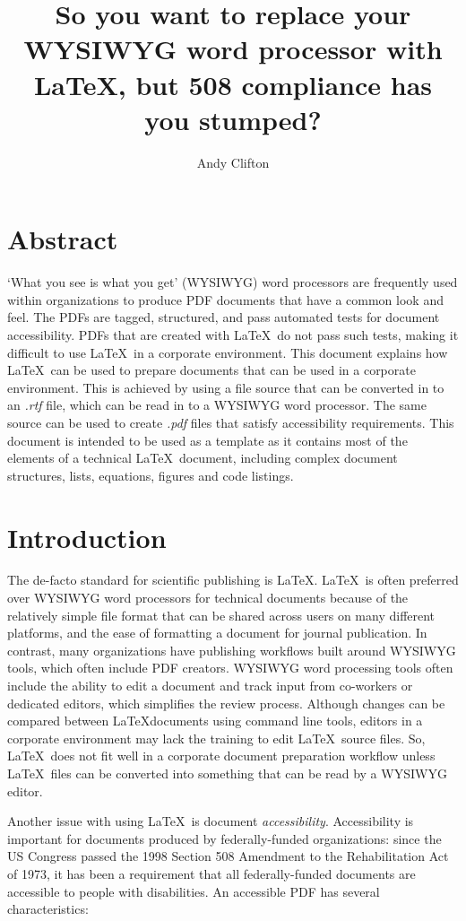 \documentclass[12pt,letterpaper]{article}
\author{Andy Clifton}
\title{So you want to replace your WYSIWYG word processor with LaTeX, but 508 compliance has you stumped?}
\newcommand{\fn}[1]{\emph{#1}}
\begin{document}
\section*{Abstract}
`What you see is what you get' (WYSIWYG) word processors are frequently used within organizations to produce PDF documents that have a common look and feel. The PDFs are tagged, structured, and pass automated tests for document accessibility. PDFs that are created with \LaTeX\ do not pass such tests, making it difficult to use \LaTeX\ in a corporate environment. This document explains how \LaTeX\ can be used to prepare documents that can be used in a corporate environment. This is achieved by using a file source that can be converted in to an \fn{.rtf} file, which can be read in to a WYSIWYG word processor. The same source can be used to create \fn{.pdf} files that satisfy accessibility requirements. This document is intended to be used as a template as it contains most of the elements of a technical \LaTeX\ document, including complex document structures, lists, equations, figures and code listings.

\clearpage
{}
\tableofcontents
\listoffigures
\listoftables

\section{Introduction}
The de-facto standard for scientific publishing is \LaTeX. \LaTeX\ is often preferred over WYSIWYG word processors for technical documents because of the relatively simple file format that can be shared across users on many different platforms, and the ease of formatting a document for journal publication. In contrast, many organizations have publishing workflows built around WYSIWYG tools, which often include PDF creators. WYSIWYG word processing tools often include the ability to edit a document and track input from co-workers or dedicated editors, which simplifies the review process. Although changes can be compared between \LaTeX documents using command line tools, editors in a corporate environment may lack the training to edit \LaTeX\ source files. So, \LaTeX\ does not fit well in a corporate document preparation workflow unless \LaTeX\ files can be converted into something that can be read by a WYSIWYG editor.

Another issue with using \LaTeX\, is document \emph{accessibility}. Accessibility is important for documents produced by federally-funded organizations: since the US Congress passed the 1998 Section 508 Amendment to the Rehabilitation Act of 1973, it has been a requirement that all federally-funded documents are accessible to people with disabilities. An accessible PDF has several characteristics:
\end{document}
